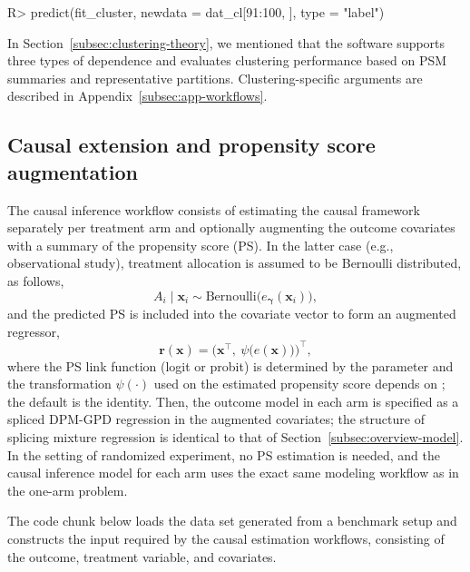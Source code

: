 \documentclass[article]{jss}\usepackage[]{graphicx}\usepackage[]{xcolor}
\renewenvironment{Schunk}{\vspace{0pt}}{\vspace{-0.1\baselineskip}}
\begin{document}
\begin{Schunk}
\begin{Sinput}
R> predict(fit_cluster, newdata = dat_cl[91:100, ], type = "label")
\end{Sinput}
\end{Schunk}

In Section~\ref{subsec:clustering-theory}, we mentioned that the software supports three types of dependence and evaluates clustering performance based on PSM summaries and representative partitions.
Clustering-specific arguments are described in Appendix~\ref{subsec:app-workflows}.



\subsection{Causal extension and propensity score augmentation}
\label{subsec:overview-causal}

The causal inference workflow consists of estimating the causal
framework separately per treatment arm and optionally augmenting the
outcome covariates with a summary of the propensity score (PS). In the
latter case (e.g., observational study), treatment allocation is
assumed to be Bernoulli distributed, as follows,
\begin{equation*}
A_i \mid \boldsymbol{x}_i \sim \mathrm{Bernoulli}\big(e_{\boldsymbol{\gamma}}(\boldsymbol{x}_i)\big),
\end{equation*}
and the predicted PS is included into the covariate vector to form an
augmented regressor,
\begin{equation*}
\boldsymbol{r}(\boldsymbol{x}) = \big(\boldsymbol{x}^\top,\ \psi\big(\widehat e(\boldsymbol{x})\big)\big)^\top,
\end{equation*}
where the PS link function (logit or probit) is determined by the
 parameter and the transformation $\psi(\cdot)$ used on the
estimated propensity score depends on ; the default
is the identity. Then, the outcome model in each arm is specified as
a spliced DPM-GPD regression in the augmented covariates; the
structure of splicing mixture regression is identical to that of
Section~\ref{subsec:overview-model}. In the setting of randomized
experiment, no PS estimation is needed, and the causal inference model
for each arm uses the exact same modeling workflow as in the
one-arm problem.

The code chunk below loads the data set generated from a benchmark
setup and constructs the input  required by the
causal estimation workflows, consisting of the outcome, treatment
variable, and covariates.
\end{document}
